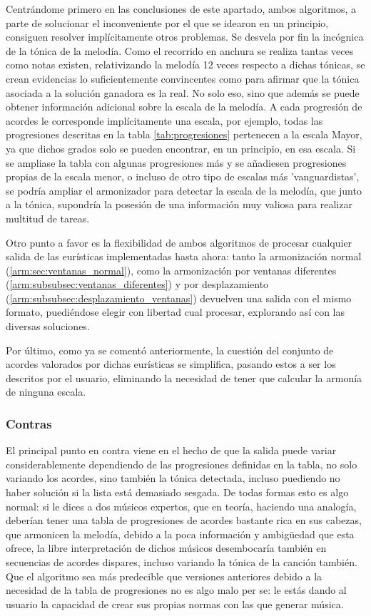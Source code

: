 Centrándome primero en las conclusiones de este apartado, ambos algoritmos, a parte de solucionar el inconveniente por el que se idearon en un principio, consiguen resolver implícitamente otros problemas. Se desvela por fin la incógnica de la tónica de la melodía. Como el recorrido en anchura se realiza tantas veces como notas existen, relativizando la melodía 12 veces respecto a dichas tónicas, se crean evidencias lo suficientemente convincentes como para afirmar que la tónica asociada a la solución ganadora es la real. No solo eso, sino que además se puede obtener información adicional sobre la escala de la melodía. A cada progresión de acordes le corresponde implícitamente una escala, por ejemplo, todas las progresiones descritas en la tabla \ref{tab:progresiones} pertenecen a la escala Mayor, ya que dichos grados solo se pueden encontrar, en un principio, en esa escala. Si se ampliase la tabla con algunas progresiones más y se añadiesen progresiones propias de la escala menor, o incluso de otro tipo de escalas más 'vanguardistas', se podría ampliar el armonizador para detectar la escala de la melodía, que junto a la tónica, supondría la posesión de una información muy valiosa para realizar multitud de tareas.

Otro punto a favor es la flexibilidad de ambos algoritmos de procesar cualquier salida de las eurísticas implementadas hasta ahora: tanto la armonización normal (\ref{arm:sec:ventanas_normal}), como la armonización por ventanas diferentes (\ref{arm:subsubsec:ventanas_diferentes}) y por desplazamiento (\ref{arm:subsubsec:desplazamiento_ventanas}) devuelven una salida con el mismo formato, puediéndose elegir con libertad cual procesar, explorando así con las diversas soluciones. 

Por último, como ya se comentó anteriormente, la cuestión del conjunto de acordes valorados por dichas eurísticas se simplifica, pasando estos a ser  los descritos por el usuario, eliminando la necesidad de tener que calcular la armonía de ninguna escala.

\subsubsection{Contras}

El principal punto en contra viene en el hecho de que la salida puede variar considerablemente dependiendo de las progresiones definidas en la tabla, no solo variando los acordes, sino también la tónica detectada, incluso puediendo no haber solución si la lista está demasiado sesgada. De todas formas esto es algo normal: si le dices a dos músicos expertos, que en teoría, haciendo una analogía, deberían tener una tabla de progresiones de acordes bastante rica en sus cabezas, que armonicen la melodía, debido a la poca información y ambigüedad que esta ofrece, la libre interpretación de dichos músicos desembocaría también en secuencias de acordes dispares, incluso variando la tónica de la canción también. Que el algoritmo sea más predecible que versiones anteriores debido a la necesidad de la tabla de progresiones no es algo malo per se: le estás dando al usuario la capacidad de crear sus propias normas con las que generar música. 

